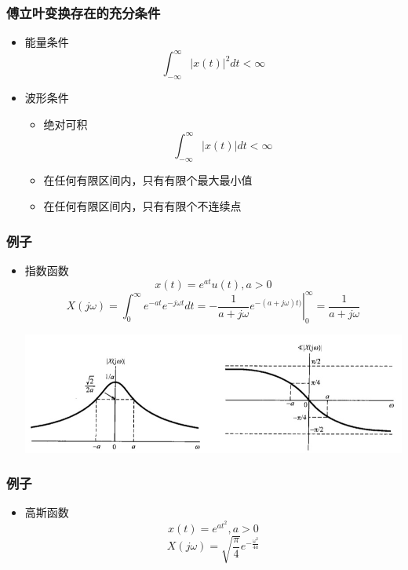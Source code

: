 \documentclass[CJKutf8,xcolor=pdftex,dvipsnames,table]{beamer}
\begin{document}
\begin{CJK*}{UTF8}{song}
\begin{frame}
  \end{frame}     
   
  \begin{frame}
    \frametitle{傅立叶变换存在的充分条件}
    \begin{itemize}
    \item 能量条件
    \[
    	 \int_{-\infty}^{\infty}|x(t)|^2dt < \infty
    \]
    \item 波形条件
    \begin{itemize}
    	\item 绝对可积
    	\[
			\int_{-\infty}^{\infty}|x(t)|dt < \infty    
    	\]
    	\item 在任何有限区间内，只有有限个最大最小值
		\item 在任何有限区间内，只有有限个不连续点
   
    	\end{itemize}
    \end{itemize}

  \end{frame} 
     
  \begin{frame}
    \frametitle{例子}
    \begin{itemize}
    \item 指数函数
    \[
		x(t) = e^{at}u(t), a>0    
    \]
    \[
    	X(j\omega) = \int_{0}^{\infty}e^{-at}e^{-j\omega t}dt =\left. -\frac{1}{a+j\omega}e^{-(a+j\omega)t)} \right\rvert_{0}^{\infty} = \frac{1}{a+j\omega}
    \]
    
    	\begin{center}
      	\includegraphics[scale=.37]{ss-c-f4-5}
    	\end{center}
    \end{itemize}

  \end{frame} 
     
  \begin{frame}
    \frametitle{例子}
    \begin{itemize}
    \item 高斯函数
    \[
		x(t) = e^{at^2}, a > 0    
    \]
    \[
    	X(j\omega) = \sqrt{\frac{\pi}{4}}e^{-\frac{\omega^2}{4a}}
    \]
    

\end{itemize}
\end{frame}
\end{CJK*}
\end{document}

